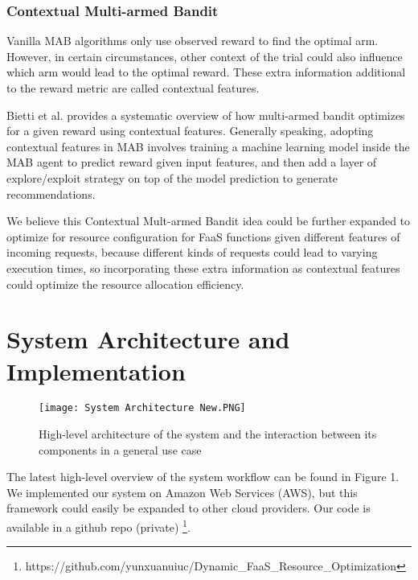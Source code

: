 \documentclass[conference]{IEEEtran}
\begin{document}
\subsubsection{Contextual Multi-armed Bandit}

Vanilla MAB algorithms only use observed reward to find the optimal arm. However, in certain circumstances, other context of the trial could also influence which arm would lead to the optimal reward. These extra information additional to the reward metric are called contextual features. 

Bietti et al. \cite{10.5555/3546258.3546391} provides a systematic overview of how multi-armed bandit optimizes for a given reward using contextual features. Generally speaking, adopting contextual features in MAB involves training a machine learning model inside the MAB agent to predict reward given input features, and then add a layer of explore/exploit strategy on top of the model prediction to generate recommendations. 

We believe this Contextual Mult-armed Bandit idea could be further expanded to optimize for resource configuration for FaaS functions given different features of incoming requests, because different kinds of requests could lead to varying execution times, so incorporating these extra information as contextual features could optimize the resource allocation efficiency.
\vspace{12pt}

\section{System Architecture and Implementation}

\begin{figure*}
    \centering
    \texttt{[image: System Architecture New.PNG]}
    \caption{High-level architecture of the system and the interaction
between its components in a general use case}
    \label{fig:enter-label}
\end{figure*}

The latest high-level overview of the system workflow can be found in Figure 1. We implemented our system on Amazon Web Services (AWS), but this framework could easily be expanded to other cloud providers. Our code is available in a github repo (private) \footnote{https://github.com/yunxuanuiuc/Dynamic\_FaaS\_Resource\_Optimization}. 
\end{document}

